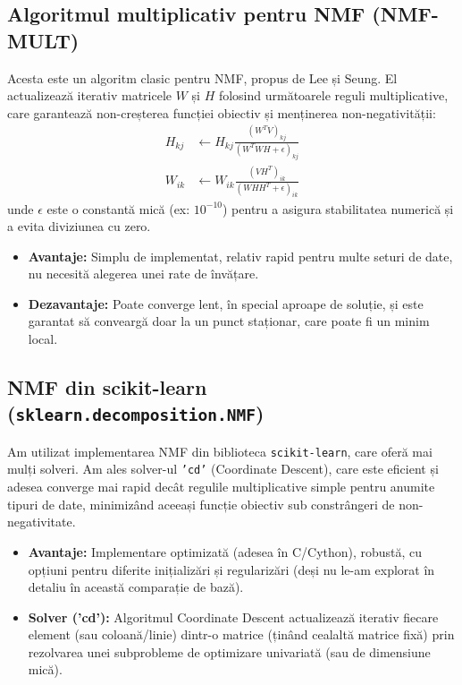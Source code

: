 \documentclass[12pt,a4paper]{article}
\begin{document}
	\subsection{Algoritmul multiplicativ pentru NMF (NMF-MULT)}
	Acesta este un algoritm clasic pentru NMF, propus de Lee și Seung. El actualizează iterativ matricele $W$ și $H$ folosind următoarele reguli multiplicative, care garantează non-creșterea funcției obiectiv și menținerea non-negativității:
	\begin{align}
		H_{kj} &\leftarrow H_{kj} \frac{(W^T V)_{kj}}{(W^T W H + \epsilon)_{kj}} \\
		W_{ik} &\leftarrow W_{ik} \frac{(V H^T)_{ik}}{(W H H^T + \epsilon)_{ik}}
	\end{align}
	unde $\epsilon$ este o constantă mică (ex: $10^{-10}$) pentru a asigura stabilitatea numerică și a evita diviziunea cu zero.
	\begin{itemize}
		\item \textbf{Avantaje:} Simplu de implementat, relativ rapid pentru multe seturi de date, nu necesită alegerea unei rate de învățare.
		\item \textbf{Dezavantaje:} Poate converge lent, în special aproape de soluție, și este garantat să conveargă doar la un punct staționar, care poate fi un minim local.
	\end{itemize}

	\subsection{NMF din scikit-learn (\texttt{sklearn.decomposition.NMF})}
	Am utilizat implementarea NMF din biblioteca \texttt{scikit-learn}, care oferă mai mulți solveri. Am ales solver-ul \texttt{'cd'} (Coordinate Descent), care este eficient și adesea converge mai rapid decât regulile multiplicative simple pentru anumite tipuri de date, minimizând aceeași funcție obiectiv sub constrângeri de non-negativitate.
	\begin{itemize}
		\item \textbf{Avantaje:} Implementare optimizată (adesea în C/Cython), robustă, cu opțiuni pentru diferite inițializări și regularizări (deși nu le-am explorat în detaliu în această comparație de bază).
		\item \textbf{Solver ('cd'):} Algoritmul Coordinate Descent actualizează iterativ fiecare element (sau coloană/linie) dintr-o matrice (ținând cealaltă matrice fixă) prin rezolvarea unei subprobleme de optimizare univariată (sau de dimensiune mică).
	\end{itemize}
\end{document}
